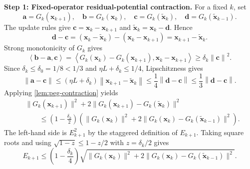 \documentclass[letterpaper,11pt]{article}
\newcommand{\norm}[1]{\left\| #1 \right\|}
\newcommand{\angles}[1]{\left\langle #1 \right \rangle}
\newcommand{\vect}[1]{\mathbf{#1}}
\begin{document}
\smallskip
\noindent\textbf{Step 1: Fixed-operator residual-potential contraction.}
For a fixed \(k\), set
\[
    \vect{a}=G_k(\vect{x}_{k+1}),\quad
    \vect{b}=G_k(\vect{x}_k),\quad
    \vect{c}=G_k(\tilde{\vect{x}}_k),\quad
    \vect{d}=G_k(\tilde{\vect{x}}_{k-1}).
\]
The update rules give \(\vect{c}=\vect{x}_k-\vect{x}_{k+1}\) and \(\tilde{\vect{x}}_k=\vect{x}_k-\vect{d}\). Hence
\[
\vect{d}-\vect{c}
=
(\vect{x}_k-\tilde{\vect{x}}_k)-(\vect{x}_k-\vect{x}_{k+1})
=
\vect{x}_{k+1}-\tilde{\vect{x}}_k.
\]
Strong monotonicity of \(G_k\) gives
\[
    \angles{\vect{b}-\vect{a},\vect{c}}
    =
    \angles{G_k(\vect{x}_k)-G_k(\vect{x}_{k+1}),\vect{x}_k-\vect{x}_{k+1}}
    \ge \delta_k\norm{\vect{c}}^2.
\]
Since \(\delta_k\le\delta_0=1/8<1/3\) and \(\eta L+\delta_k\le1/4\), Lipschitzness gives
\[
    \norm{\vect{a}-\vect{c}}
    \le
    (\eta L+\delta_k)\norm{\vect{x}_{k+1}-\tilde{\vect{x}}_k}
    \le
    \frac14\norm{\vect{d}-\vect{c}}
    \le
    \frac13\norm{\vect{d}-\vect{c}}.
\]
Applying \cref{lem:peg-contraction} yields
\[
\begin{aligned}
&\|G_k(\vect{x}_{k+1})\|^2
  +2\|G_k(\vect{x}_{k+1})-G_k(\tilde{\vect{x}}_k)\|^2 \\
&\qquad\le
\left(1-\frac{\delta_k}{2}\right)
\left(
\|G_k(\vect{x}_k)\|^2
+2\|G_k(\vect{x}_k)-G_k(\tilde{\vect{x}}_{k-1})\|^2
\right).
\end{aligned}
\]
The left-hand side is \(E_{k+1}^2\) by the staggered definition of \(E_{k+1}\).
Taking square roots and using \(\sqrt{1-z}\le1-z/2\) with \(z=\delta_k/2\) gives
\[
E_{k+1}
\le
\left(1-\frac{\delta_k}{4}\right)
\sqrt{
\|G_k(\vect{x}_k)\|^2
+2\|G_k(\vect{x}_k)-G_k(\tilde{\vect{x}}_{k-1})\|^2}.
\]
\end{document}
